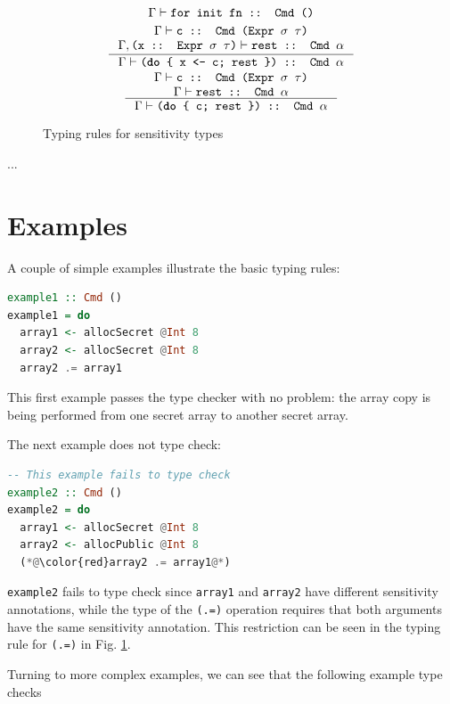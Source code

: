 \documentclass[10pt, conference]{IEEEtran}
\newcommand{\ttt}{\texttt}
\begin{document}
\begin{figure}
{\begin{minipage}{\linewidth}
\begin{gather*}
{    }{\Gamma \vdash \ttt{for init fn :: Cmd ()}}\\
  \inference{%
    \Gamma \vdash \ttt{c :: Cmd (Expr $\sigma$ $\tau$)}
    \\ \Gamma,\ttt{(x :: Expr $\sigma$ $\tau$)} \vdash \ttt{rest :: Cmd $\alpha$}
  }{%
    \Gamma \vdash \ttt{(\textbf{do} \{ x <- c; rest \}) :: Cmd $\alpha$}
  }\\
  \inference{%
    \Gamma \vdash \ttt{c :: Cmd (Expr $\sigma$ $\tau$)}
    \\ \Gamma \vdash \ttt{rest :: Cmd $\alpha$}
  }{%
    \Gamma \vdash \ttt{(\textbf{do} \{ c; rest \}) :: Cmd $\alpha$}
  }
\end{gather*}
\end{minipage}}
  \caption{Typing rules for sensitivity types}
\label{fig:SensTypes}
\end{figure}

...

\section{Examples}
\label{sec:Examples}

A couple of simple examples illustrate the basic typing rules:

\begin{lstlisting}[language=haskell]
example1 :: Cmd ()
example1 = do
  array1 <- allocSecret @Int 8
  array2 <- allocSecret @Int 8
  array2 .= array1
\end{lstlisting}

\noindent This first example passes the type checker with no problem: the array copy
is being performed from one secret array to another secret array.

The next example does not type check:

\begin{lstlisting}[language=haskell]
  -- This example fails to type check
example2 :: Cmd ()
example2 = do
  array1 <- allocSecret @Int 8
  array2 <- allocPublic @Int 8
  (*@\color{red}array2 .= array1@*)
\end{lstlisting}

\noindent \ttt{example2} fails to type check since \ttt{array1} and \ttt{array2} have
different sensitivity annotations, while the type of the \ttt{(.=)} operation
requires that both arguments have the same sensitivity annotation. This restriction can
be seen in the typing rule for \ttt{(.=)} in Fig. \ref{fig:SensTypes}.

Turning to more complex examples, we can see that the following example type checks
\end{document}
